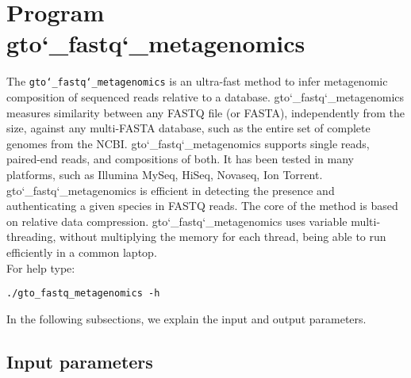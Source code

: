 \section{Program gto\char`_fastq\char`_metagenomics}

The \texttt{gto\char`_fastq\char`_metagenomics} is an ultra-fast method to infer metagenomic composition of sequenced reads relative to a database. gto\char`_fastq\char`_metagenomics measures similarity between any FASTQ file (or FASTA), independently from the size, against any multi-FASTA database, such as the entire set of complete genomes from the NCBI. gto\char`_fastq\char`_metagenomics supports single reads, paired-end reads, and compositions of both. It has been tested in many platforms, such as Illumina MySeq, HiSeq, Novaseq, Ion Torrent.\\
gto\char`_fastq\char`_metagenomics is efficient in detecting the presence and authenticating a given species in FASTQ reads. The core of the method is based on relative data compression. gto\char`_fastq\char`_metagenomics uses variable multi-threading, without multiplying the memory for each thread, being able to run efficiently in a common laptop.\\

For help type:
\begin{lstlisting}
./gto_fastq_metagenomics -h
\end{lstlisting}

In the following subsections, we explain the input and output parameters.

\subsection*{Input parameters}

